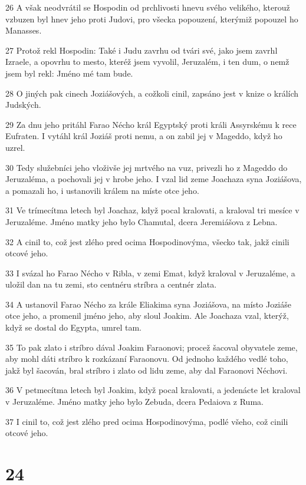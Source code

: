 \par 26 A však neodvrátil se Hospodin od prchlivosti hnevu svého velikého, kterouž vzbuzen byl hnev jeho proti Judovi, pro všecka popouzení, kterýmiž popouzel ho Manasses.
\par 27 Protož rekl Hospodin: Také i Judu zavrhu od tvári své, jako jsem zavrhl Izraele, a opovrhu to mesto, kteréž jsem vyvolil, Jeruzalém, i ten dum, o nemž jsem byl rekl: Jméno mé tam bude.
\par 28 O jiných pak cinech Joziášových, a cožkoli cinil, zapsáno jest v knize o králích Judských.
\par 29 Za dnu jeho pritáhl Farao Nécho král Egyptský proti králi Assyrskému k rece Eufraten. I vytáhl král Joziáš proti nemu, a on zabil jej v Mageddo, když ho uzrel.
\par 30 Tedy služebníci jeho vloživše jej mrtvého na vuz, privezli ho z Mageddo do Jeruzaléma, a pochovali jej v hrobe jeho. I vzal lid zeme Joachaza syna Joziášova, a pomazali ho, i ustanovili králem na míste otce jeho.
\par 31 Ve trímecítma letech byl Joachaz, když pocal kralovati, a kraloval tri mesíce v Jeruzaléme. Jméno matky jeho bylo Chamutal, dcera Jeremiášova z Lebna.
\par 32 A cinil to, což jest zlého pred ocima Hospodinovýma, všecko tak, jakž cinili otcové jeho.
\par 33 I svázal ho Farao Nécho v Ribla, v zemi Emat, když kraloval v Jeruzaléme, a uložil dan na tu zemi, sto centnéru stríbra a centnér zlata.
\par 34 A ustanovil Farao Nécho za krále Eliakima syna Joziášova, na místo Joziáše otce jeho, a promenil jméno jeho, aby sloul Joakim. Ale Joachaza vzal, kterýž, když se dostal do Egypta, umrel tam.
\par 35 To pak zlato i stríbro dával Joakim Faraonovi; procež šacoval obyvatele zeme, aby mohl dáti stríbro k rozkázaní Faraonovu. Od jednoho každého vedlé toho, jakž byl šacován, bral stríbro i zlato od lidu zeme, aby dal Faraonovi Néchovi.
\par 36 V petmecítma letech byl Joakim, když pocal kralovati, a jedenácte let kraloval v Jeruzaléme. Jméno matky jeho bylo Zebuda, dcera Pedaiova z Ruma.
\par 37 I cinil to, což jest zlého pred ocima Hospodinovýma, podlé všeho, což cinili otcové jeho.

\chapter{24}

